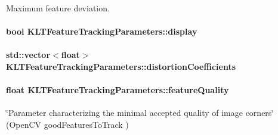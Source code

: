 Maximum feature deviation. 

\hypertarget{structKLTFeatureTrackingParameters_a2751a5a7daba84d0ec5595ead46cfd2b}{
\paragraph[{display}]{\setlength{\rightskip}{0pt plus 5cm}bool K\-L\-T\-Feature\-Tracking\-Parameters\-::display}}\label{structKLTFeatureTrackingParameters_a2751a5a7daba84d0ec5595ead46cfd2b}
\hypertarget{structKLTFeatureTrackingParameters_a669fd53774f24cb51afdd226c4cbe4fc}{
\paragraph[{distortion\-Coefficients}]{\setlength{\rightskip}{0pt plus 5cm}std\-::vector$<$float$>$ K\-L\-T\-Feature\-Tracking\-Parameters\-::distortion\-Coefficients}}\label{structKLTFeatureTrackingParameters_a669fd53774f24cb51afdd226c4cbe4fc}
\hypertarget{structKLTFeatureTrackingParameters_a062d49d0d11189735724e049d9f72765}{
\paragraph[{feature\-Quality}]{\setlength{\rightskip}{0pt plus 5cm}float K\-L\-T\-Feature\-Tracking\-Parameters\-::feature\-Quality}}\label{structKLTFeatureTrackingParameters_a062d49d0d11189735724e049d9f72765}


\char`\"{}\-Parameter characterizing the minimal accepted quality of image corners\char`\"{} (Open\-C\-V good\-Features\-To\-Track ) 

